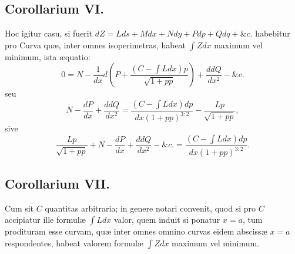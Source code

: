 \subsection*{Corollarium VI.}
Hoc igitur casu, si fuerit $dZ=Lds+Mdx+Ndy+Pdp+Qdq+\&c.$ habebitur pro Curva quæ, inter omnes isoperimetras, habeat $\int Zdx$ maximum vel minimum, ista æquatio:
\[0=N-\frac1{dx}d\left(P+\frac{(C-\int Ldx)p}{\sqrt{1+pp}}\right)+\frac{ddQ}{dx^2}-\&c.\]
seu
\[N-\frac{dP}{dx}+\frac{ddQ}{dx^2}=\frac{(C-\int Ldx)dp}{dx(1+pp)^{3:2}}-\frac{Lp}{\sqrt{1+pp}},\]
sive
\[\frac{Lp}{\sqrt{1+pp}}+N-\frac{dP}{dx}+\frac{ddQ}{dx^2}-\&c.=\frac{(C-\int Ldx)dp}{dx(1+pp)^{3:2}}.\]

\subsection*{Corollarium VII.}
Cum sit $C$ quantitas arbitraria; in genere notari convenit, quod si pro $C$ accipiatur ille formulæ $\int Ldx$ valor, quem induit si ponatur $x=a$, tum prodituram esse curvam, quæ inter omnes omnino curvas eidem abscissæ $x=a$ respondentes, habeat valorem formulæ $\int Zdx$ maximum vel minimum.

